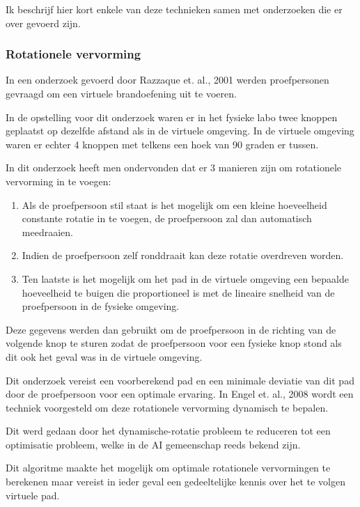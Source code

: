 \documentclass[a4paper,12pt]{article}
\begin{document}
Ik beschrijf hier kort enkele van deze technieken samen met onderzoeken die er 
over gevoerd zijn.


\subsubsection{Rotationele vervorming}
In een onderzoek gevoerd door Razzaque et. al., 2001 \cite{kohn01} werden 
proefpersonen gevraagd om een virtuele brandoefening uit te voeren.

In de opstelling voor dit onderzoek waren er in het fysieke labo twee knoppen
geplaatst op dezelfde afstand als in de virtuele omgeving. In de virtuele
omgeving waren er echter 4 knoppen met telkens een hoek van 90 graden er tussen.

In dit onderzoek heeft men ondervonden dat er 3 manieren zijn om rotationele
vervorming in te voegen:

\begin{enumerate}
    \item Als de proefpersoon stil staat is het mogelijk om een kleine 
        hoeveelheid constante rotatie in te voegen, de proefpersoon zal dan 
        automatisch meedraaien.
    \item Indien de proefpersoon zelf ronddraait kan deze rotatie overdreven 
        worden.
    \item Ten laatste is het mogelijk om het pad in de virtuele omgeving een
        bepaalde hoeveelheid te buigen die proportioneel is met de lineaire
        snelheid van de proefpersoon in de fysieke omgeving.
\end{enumerate}

Deze gegevens werden dan gebruikt om de proefpersoon in de richting van de 
volgende knop te sturen zodat de proefpersoon voor een fysieke knop stond als dit 
ook het geval was in de virtuele omgeving.

Dit onderzoek vereist een voorberekend pad en een minimale deviatie van dit pad 
door de proefpersoon voor een optimale ervaring. In Engel et. al., 2008 
\cite{engel08} wordt een techniek voorgesteld om deze rotationele vervorming 
dynamisch te bepalen.

Dit werd gedaan door het dynamische-rotatie probleem te reduceren tot een 
optimisatie probleem, welke in de AI gemeenschap reeds bekend zijn.

Dit algoritme maakte het mogelijk om optimale rotationele vervormingen te 
berekenen maar vereist in ieder geval een gedeeltelijke kennis over het te volgen
virtuele pad.
\end{document}
